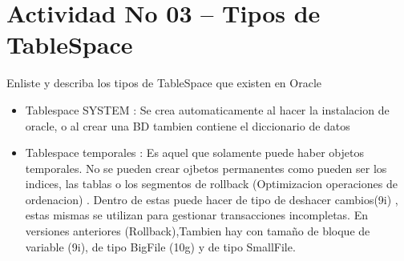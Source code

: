 \section{Actividad No 03 – Tipos de TableSpace} 
Enliste y describa los tipos de TableSpace que existen en Oracle
		
\begin{itemize}
\item Tablespace SYSTEM : Se crea automaticamente al hacer la instalacion de oracle, o al crear una BD tambien contiene el diccionario de datos

\item Tablespace temporales : Es aquel que solamente puede haber objetos temporales. No se pueden crear ojbetos permanentes como pueden ser los indices, las tablas o los segmentos de rollback (Optimizacion operaciones de ordenacion) . Dentro de estas puede hacer de tipo de deshacer cambios(9i) , estas mismas se utilizan para gestionar transacciones incompletas. En versiones anteriores (Rollback),Tambien hay con tamaño de bloque de variable (9i), de tipo BigFile (10g) y de tipo SmallFile.
\end{itemize} 


